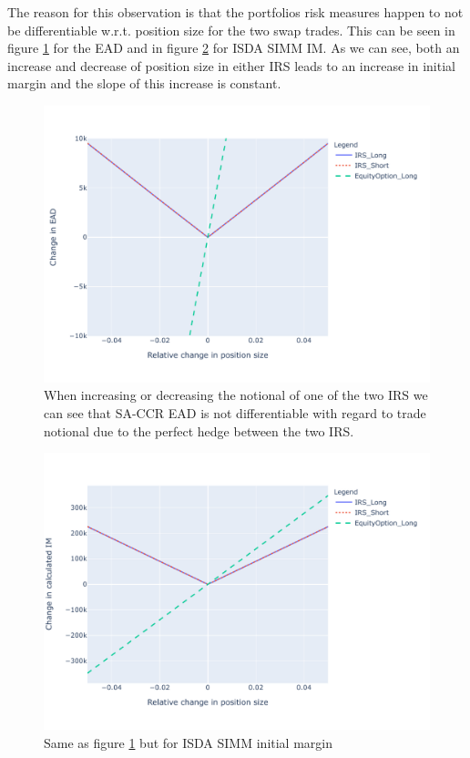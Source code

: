 \documentclass[../Thesis_AHoecherl.tex]{subfiles}
\begin{document}
    The reason for this observation is that the portfolios risk measures happen to not be differentiable w.r.t. position size for the two swap trades. This can be seen in figure \ref{fig:indifferentiability of ead} for the \gls{EAD} and in figure \ref{fig:indifferentiability of im} for \gls{ISDA SIMM} \gls{IM}.
    As we can see, both an increase and decrease of position size in either \gls{IRS} leads to an increase in initial margin and the slope of this increase is constant.

    \begin{figure}
        \centering
        \includegraphics{Graphics/Indifferentiabililty_of_EAD.pdf}
        \caption[Non-differentiability of \gls{SA-CCR} \gls{EAD}]{When increasing or decreasing the notional of one of the two \gls{IRS} we can see that \gls{SA-CCR} \gls{EAD} is not differentiable with regard to trade notional due to the perfect hedge between the two \gls{IRS}.}
        \label{fig:indifferentiability of ead}
    \end{figure}

    \begin{figure}
        \centering
        \includegraphics{Graphics/Indifferentiabililty_of_IM.pdf}
        \caption[Non-differentiability of \gls{ISDA SIMM}]{Same as figure \ref{fig:indifferentiability of ead} but for \gls{ISDA SIMM} initial margin}
        \label{fig:indifferentiability of im}
    \end{figure}
    
    
\end{document}
